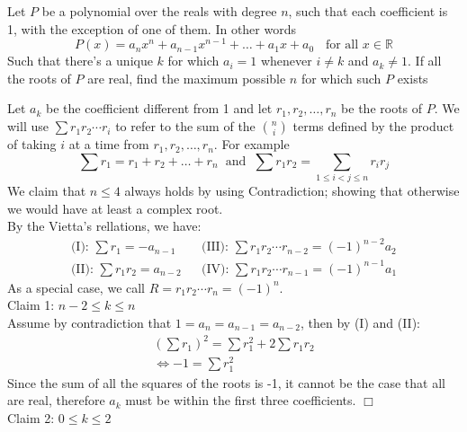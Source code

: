 \begin{problem}
    Let $P$ be a polynomial over the reals with degree $n$, such that each coefficient is 1, with the exception of one of them. In other words 
    $$ P(x) = a_nx^n + a_{n-1}x^{n-1} + \ldots + a_1x + a_0 \hspace{7pt} \text{ for all } x \in \mathbb{R}$$
    Such that there's a unique $k$ for which $a_i = 1$ whenever $i \neq k$ and $a_k \neq 1$. If all the roots of $P$ are real, find the maximum possible $n$ for which such $P$ exists
\end{problem}

\begin{solution}[$n=4$]
    Let $a_k$ be the coefficient different from 1 and let $r_1, r_2, \ldots , r_n$ be the roots of $P$. We will use $\sum r_{1} r_2 \cdots r_i$ to refer to the sum of the $\binom{n}{i}$ terms defined by the product of taking $i$ at a time from $r_1, r_2, \ldots, r_n$. For example 
    $$\sum r_1 = r_1+r_2 + \ldots + r_n  \hspace{7pt} \text{and} \hspace{7pt} \sum r_1r_2 = \sum_{1 \leq i < j \leq n} r_ir_j$$
    We claim that $n \leq 4$ always holds by using Contradiction; showing that otherwise we would have at least a complex root.  \\[3mm]
    By the Vietta's rellations, we have:
    \begin{align*}
        \text{(I): } \sum r_1 = -a_{n-1} && \text{(III): } \sum r_1 r_2 \cdots r_{n-2} = (-1)^{n-2} a_2 \\
        \text{(II): } \sum r_1r_2 = a_{n-2} && \text{(IV): }\sum r_1 r_2 \cdots r_{n-1} = (-1)^{n-1} a_1
    \end{align*}
    As a special case, we call $R = r_1r_2 \cdots r_n = (-1)^n$. \\[1.5mm]
    Claim 1: $n-2 \leq k \leq n$ \\[1.2mm]
        Assume by contradiction that $1 = a_n = a_{n-1} = a_{n-2}$, then by (I) and (II):
        \begin{align*}
            \left ( \sum r_1 \right )^2 = \sum r_1^2 + 2 \sum r_1 r_2 \\
            \iff -1 = \sum r_1^2 
        \end{align*}
        Since the sum of all the squares of the roots is -1, it cannot be the case that all are real, therefore $a_k$ must be within the first three coefficients. $\Box$ \\[2mm]
    Claim 2: $0 \leq k \leq 2$ \\[1.2mm]

\end{solution}
